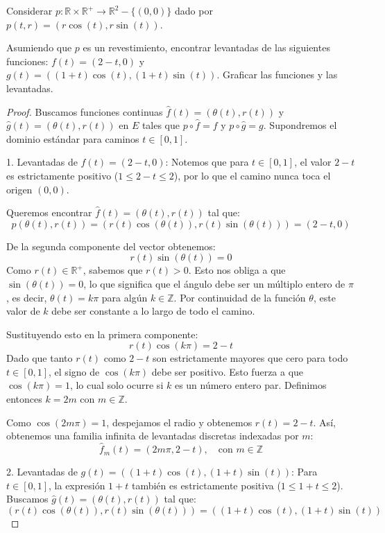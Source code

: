 \documentclass{article}
\theoremstyle{plain}
\theoremstyle{definition}
\newcommand{\R}{\mathbb{R}}
\newenvironment{ejercicio}[1]{\begin{trivlist}
\item[\hskip \labelsep {\bfseries Ejercicio}\hskip \labelsep {\bfseries #1.}]}{\end{trivlist}}
\begin{document}
\begin{ejercicio}{7}
    Considerar \( p:\R \times \R^{+} \rightarrow \R^2 - \{(0,0)\} \) dado por \( p(t,r) = (r\cos(t), r\sin(t)) \).

    Asumiendo que \( p \) es un revestimiento, encontrar levantadas de las siguientes funciones: \( f(t)=(2-t,0) \) y \( g(t)=((1+t)\cos(t), (1+t)\sin(t)) \).
    Graficar las funciones y las levantadas.
\end{ejercicio}
\begin{proof}
    Buscamos funciones continuas \( \hat{f}(t) = (\theta(t), r(t)) \) y \( \hat{g}(t) = (\theta(t), r(t)) \) en \( E \) tales que \( p \circ \hat{f} = f \) y \( p \circ \hat{g} = g \). Supondremos el dominio estándar para caminos \( t \in [0,1] \).

    1. Levantadas de \( f(t) = (2-t, 0) \):
    Notemos que para \( t \in [0,1] \), el valor \( 2-t \) es estrictamente positivo (\( 1 \le 2-t \le 2 \)), por lo que el camino nunca toca el origen \( (0,0) \).

    Queremos encontrar \( \hat{f}(t) = (\theta(t), r(t)) \) tal que:
    \[ p(\theta(t), r(t)) = (r(t)\cos(\theta(t)), r(t)\sin(\theta(t))) = (2-t, 0) \]

    De la segunda componente del vector obtenemos:
    \[ r(t)\sin(\theta(t)) = 0 \]
    Como \( r(t) \in \mathbb{R}^{+} \), sabemos que \( r(t) > 0 \). Esto nos obliga a que \( \sin(\theta(t)) = 0 \), lo que significa que el ángulo debe ser un múltiplo entero de \( \pi \), es decir, \( \theta(t) = k\pi \) para algún \( k \in \mathbb{Z} \). Por continuidad de la función \( \theta \), este valor de \( k \) debe ser constante a lo largo de todo el camino.

    Sustituyendo esto en la primera componente:
    \[ r(t)\cos(k\pi) = 2-t \]
    Dado que tanto \( r(t) \) como \( 2-t \) son estrictamente mayores que cero para todo \( t \in [0,1] \), el signo de \( \cos(k\pi) \) debe ser positivo. Esto fuerza a que \( \cos(k\pi) = 1 \), lo cual solo ocurre si \( k \) es un número entero par. Definimos entonces \( k = 2m \) con \( m \in \mathbb{Z} \).

    Como \( \cos(2m\pi) = 1 \), despejamos el radio y obtenemos \( r(t) = 2-t \). Así, obtenemos una familia infinita de levantadas discretas indexadas por \( m \):
    \[ \hat{f}_m(t) = (2m\pi, 2-t), \quad \text{con } m \in \mathbb{Z} \]

    2. Levantadas de \( g(t) = ((1+t)\cos(t), (1+t)\sin(t)) \):
    Para \( t \in [0,1] \), la expresión \( 1+t \) también es estrictamente positiva (\( 1 \le 1+t \le 2 \)). Buscamos \( \hat{g}(t) = (\theta(t), r(t)) \) tal que:
    \[ (r(t)\cos(\theta(t)), r(t)\sin(\theta(t))) = ((1+t)\cos(t), (1+t)\sin(t)) \]


\end{proof}
\end{document}
